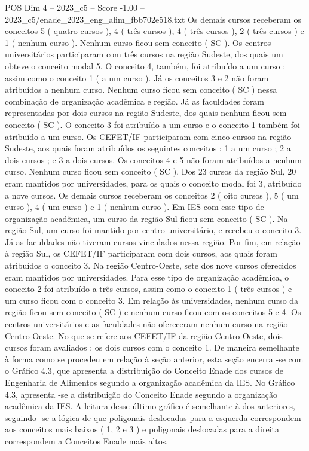 \begin{textsample}{POS Dim 4 – 2023\_c5 – Score -1.00 – 2023\_c5/enade\_2023\_eng\_alim\_fbb702e518.txt}
Os demais cursos receberam os conceitos 5 ( quatro cursos ), 4 ( três cursos ), 4 ( três cursos ), 2 ( três cursos ) e 1 ( nenhum curso ).
Nenhum curso ficou sem conceito ( SC ).
Os centros universitários participaram com três cursos na região Sudeste, dos quais um obteve o conceito modal 5.
O conceito 4, também, foi atribuído a um curso ; assim como o conceito 1 ( a um curso ).
Já os conceitos 3 e 2 não foram atribuídos a nenhum curso.
Nenhum curso ficou sem conceito ( SC ) nessa combinação de organização acadêmica e região.
Já as faculdades foram representadas por dois cursos na região Sudeste, dos quais nenhum ficou sem conceito ( SC ).
O conceito 3 foi atribuído a um curso e o conceito 1 também foi atribuído a um curso.
Os CEFET/IF participaram com cinco cursos na região Sudeste, aos quais foram atribuídos os seguintes conceitos : 1 a um curso ; 2 a dois cursos ; e 3 a dois cursos.
Os conceitos 4 e 5 não foram atribuídos a nenhum curso.
Nenhum curso ficou sem conceito ( SC ).
Dos 23 cursos da região Sul, 20 eram mantidos por universidades, para os quais o conceito modal foi 3, atribuído a nove cursos.
Os demais cursos receberam os conceitos 2 ( oito cursos ), 5 ( um curso ), 4 ( um curso ) e 1 ( nenhum curso ).
Em IES com esse tipo de organização acadêmica, um curso da região Sul ficou sem conceito ( SC ).
Na região Sul, um curso foi mantido por centro universitário, e recebeu o conceito 3.
Já as faculdades não tiveram cursos vinculados nessa região.
Por fim, em relação à região Sul, os CEFET/IF participaram com dois cursos, aos quais foram atribuídos o conceito 3.
Na região Centro-Oeste, sete dos nove cursos oferecidos eram mantidos por universidades.
Para esse tipo de organização acadêmica, o conceito 2 foi atribuído a três cursos, assim como o conceito 1 ( três cursos ) e um curso ficou com o conceito 3.
Em relação às universidades, nenhum curso da região ficou sem conceito ( SC ) e nenhum curso ficou com os conceitos 5 e 4.
Os centros universitários e as faculdades não ofereceram nenhum curso na região Centro-Oeste.
No que se refere aos CEFET/IF da região Centro-Oeste, dois cursos foram avaliados : os dois cursos com o conceito 1.
De maneira semelhante à forma como se procedeu em relação à seção anterior, esta seção encerra -se com o Gráfico 4.3, que apresenta a distribuição do Conceito Enade dos cursos de Engenharia de Alimentos segundo a organização acadêmica da IES.
No Gráfico 4.3, apresenta -se a distribuição do Conceito Enade segundo a organização acadêmica da IES.
A leitura desse último gráfico é semelhante à dos anteriores, seguindo -se a lógica de que poligonais deslocadas para a esquerda correspondem aos conceitos mais baixos ( 1, 2 e 3 ) e poligonais deslocadas para a direita correspondem a Conceitos Enade mais altos.

\end{textsample}
